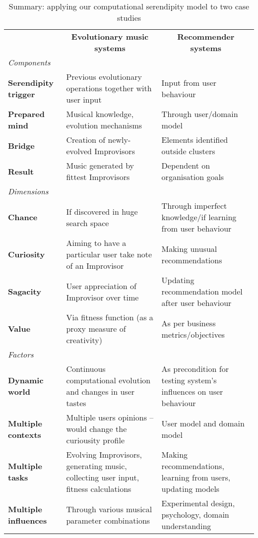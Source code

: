 \begin{table}[Ht!]
{\centering \renewcommand{\arraystretch}{1.5}
\footnotesize
\begin{tabular}{p{.7in}@{\hspace{.1in}}p{1.9in}@{\hspace{.1in}}p{1.9in}}
\multicolumn{1}{c}{} & \multicolumn{1}{c}{\textbf{Evolutionary music systems}} & \multicolumn{1}{c}{\textbf{Recommender systems}} \\[-.1in]
\multicolumn{1}{l}{\em Components} & \multicolumn{1}{c}{} & \multicolumn{1}{c}{} \\
\cline{2-3}
\textbf{Serendipity trigger} & Previous evolutionary operations together with user input & Input from user behaviour \\
\textbf{Prepared mind} & Musical knowledge, evolution mechanisms & Through user/domain model \\
\textbf{Bridge}  & Creation of newly-evolved Improvisors & Elements identified outside clusters \\
\textbf{Result} & Music generated by fittest Improvisors& Dependent on organisation goals \\ \cline{2-3}
\multicolumn{1}{l}{\em Dimensions} & \multicolumn{1}{c}{} & \multicolumn{1}{c}{} \\
\cline{2-3}
\textbf{Chance} & If discovered in huge search space & Through imperfect knowledge/if learning from user behaviour \\
\textbf{Curiosity} & Aiming to have a particular user take note of an Improvisor & Making unusual recommendations \\
\textbf{Sagacity} & User appreciation of Improvisor over time & Updating recommendation model after user behaviour \\
\textbf{Value} & Via fitness function (as a proxy measure of creativity) & As per business metrics/objectives \\
\cline{2-3}
\multicolumn{1}{l}{\em Factors} & \multicolumn{1}{c}{} & \multicolumn{1}{c}{} \\
\cline{2-3}
\textbf{Dynamic world}  & Continuous computational evolution and changes in user tastes& As precondition for testing system's influences on user behaviour\\
\textbf{Multiple contexts} & Multiple users opinions -- would change the curiousity profile & User model and domain model\\
\textbf{Multiple tasks} & Evolving Improvisors, generating music, collecting user input, fitness calculations & Making recommendations, learning from users, updating models \\
\textbf{Multiple influences} & Through various musical parameter combinations& Experimental design, psychology, domain understanding\\
\cline{2-3}
\end{tabular}
\par}
\bigskip
\caption{Summary: applying our computational serendipity model to two case studies\label{caseStudies}}
\end{table}%
\normalsize

